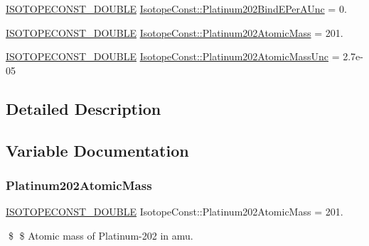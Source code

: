 \begin{DoxyCompactItemize}
\mbox{\hyperlink{group___isotope_const-_macros_ga8f45a7272ce02c0b4c65c44636ed719a}{I\+S\+O\+T\+O\+P\+E\+C\+O\+N\+S\+T\+\_\+\+D\+O\+U\+B\+LE}} \mbox{\hyperlink{group___isotope_const-_platinum-_pt202_gaf058c0798d44b7a2f4b0393eb5ce560f}{Isotope\+Const\+::\+Platinum202\+Bind\+E\+Per\+A\+Unc}} = 0.
\item 
\mbox{\hyperlink{group___isotope_const-_macros_ga8f45a7272ce02c0b4c65c44636ed719a}{I\+S\+O\+T\+O\+P\+E\+C\+O\+N\+S\+T\+\_\+\+D\+O\+U\+B\+LE}} \mbox{\hyperlink{group___isotope_const-_platinum-_pt202_ga2b4d70f27e6a71b0929936929193cf14}{Isotope\+Const\+::\+Platinum202\+Atomic\+Mass}} = 201.
\item 
\mbox{\hyperlink{group___isotope_const-_macros_ga8f45a7272ce02c0b4c65c44636ed719a}{I\+S\+O\+T\+O\+P\+E\+C\+O\+N\+S\+T\+\_\+\+D\+O\+U\+B\+LE}} \mbox{\hyperlink{group___isotope_const-_platinum-_pt202_ga7298f7b97489381671c8e96427599dc7}{Isotope\+Const\+::\+Platinum202\+Atomic\+Mass\+Unc}} = 2.\+7e-\/05
\end{DoxyCompactItemize}


\subsection{Detailed Description}


\subsection{Variable Documentation}
\mbox{\label{group___isotope_const-_platinum-_pt202_ga2b4d70f27e6a71b0929936929193cf14}} 
\subsubsection{\texorpdfstring{Platinum202\+Atomic\+Mass}{Platinum202AtomicMass}}
{\footnotesize\ttfamily \mbox{\hyperlink{group___isotope_const-_macros_ga8f45a7272ce02c0b4c65c44636ed719a}{I\+S\+O\+T\+O\+P\+E\+C\+O\+N\+S\+T\+\_\+\+D\+O\+U\+B\+LE}} Isotope\+Const\+::\+Platinum202\+Atomic\+Mass = 201.}

\$ \$ Atomic mass of Platinum-\/202 in amu. \mbox{\label{group___isotope_const-_platinum-_pt202_ga7298f7b97489381671c8e96427599dc7}} 
